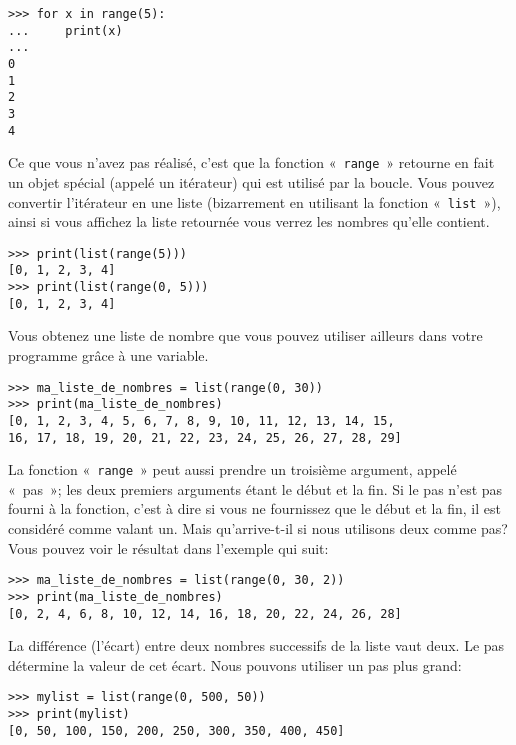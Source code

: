\begin{Verbatim}[frame=single,rulecolor=\color{gray}]
>>> for x in range(5):
...     print(x)
... 
0
1
2
3
4
\end{Verbatim}

Ce que vous n'avez pas réalisé, c'est que la fonction «~\texttt{range}~» retourne en fait un objet spécial (appelé un itérateur) qui est utilisé par la boucle. Vous pouvez convertir l'itérateur en une liste (bizarrement en utilisant la fonction «~\texttt{list}~»), ainsi si vous affichez la liste retournée vous verrez les nombres qu'elle contient.  

\begin{Verbatim}[frame=single,rulecolor=\color{gray}]
>>> print(list(range(5)))
[0, 1, 2, 3, 4]
>>> print(list(range(0, 5)))
[0, 1, 2, 3, 4]
\end{Verbatim}

Vous obtenez une liste de nombre que vous pouvez utiliser ailleurs dans votre programme grâce à une variable.

\begin{Verbatim}[frame=single,rulecolor=\color{gray}]
>>> ma_liste_de_nombres = list(range(0, 30))
>>> print(ma_liste_de_nombres)
[0, 1, 2, 3, 4, 5, 6, 7, 8, 9, 10, 11, 12, 13, 14, 15, 
16, 17, 18, 19, 20, 21, 22, 23, 24, 25, 26, 27, 28, 29]
\end{Verbatim}

La fonction «~\texttt{range}~» peut aussi prendre un troisième argument, appelé «~pas~»; les deux premiers arguments étant le début et la fin.
Si le pas n'est pas fourni à la fonction, c'est à dire si vous ne fournissez que le début et la fin, il est considéré comme valant un. Mais qu'arrive-t-il si nous utilisons deux comme pas? Vous pouvez voir le résultat dans l'exemple qui suit:
\begin{Verbatim}[frame=single,rulecolor=\color{gray}]
>>> ma_liste_de_nombres = list(range(0, 30, 2))
>>> print(ma_liste_de_nombres)
[0, 2, 4, 6, 8, 10, 12, 14, 16, 18, 20, 22, 24, 26, 28]
\end{Verbatim}

La différence (l'écart) entre deux nombres successifs de la liste vaut deux. Le pas détermine la valeur de cet écart. Nous pouvons utiliser un pas plus grand:
\begin{Verbatim}[frame=single,rulecolor=\color{gray}]
>>> mylist = list(range(0, 500, 50))
>>> print(mylist)
[0, 50, 100, 150, 200, 250, 300, 350, 400, 450]
\end{Verbatim}

